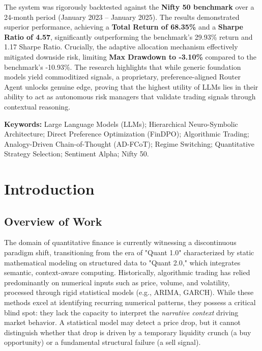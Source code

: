 \documentclass[12pt, a4paper]{report}
\begin{document}
The system was rigorously backtested against the \textbf{Nifty 50 benchmark} over a 24-month period (January 2023 – January 2025). The results demonstrated superior performance, achieving a \textbf{Total Return of 68.35\%} and a \textbf{Sharpe Ratio of 4.57}, significantly outperforming the benchmark’s 29.93\% return and 1.17 Sharpe Ratio. Crucially, the adaptive allocation mechanism effectively mitigated downside risk, limiting \textbf{Max Drawdown to -3.10\%} compared to the benchmark's -10.93\%. The research highlights that while generic foundation models yield commoditized signals, a proprietary, preference-aligned Router Agent unlocks genuine edge, proving that the highest utility of LLMs lies in their ability to act as autonomous risk managers that validate trading signals through contextual reasoning.

\vspace{1em}
\textbf{Keywords:} Large Language Models (LLMs); Hierarchical Neuro-Symbolic Architecture; Direct Preference Optimization (FinDPO); Algorithmic Trading; Analogy-Driven Chain-of-Thought (AD-FCoT); Regime Switching; Quantitative Strategy Selection; Sentiment Alpha; Nifty 50.


\newpage
\tableofcontents
\newpage
\listoffigures
\listoftables



\newpage
{}


\newpage
\chapter{Introduction}

\section{Overview of Work}

The domain of quantitative finance is currently witnessing a discontinuous paradigm shift, transitioning from the era of "Quant 1.0" characterized by static mathematical modeling on structured data to "Quant 2.0," which integrates semantic, context-aware computing. Historically, algorithmic trading has relied predominantly on numerical inputs such as price, volume, and volatility, processed through rigid statistical models (e.g., ARIMA, GARCH). While these methods excel at identifying recurring numerical patterns, they possess a critical blind spot: they lack the capacity to interpret the \textit{narrative context} driving market behavior. A statistical model may detect a price drop, but it cannot distinguish whether that drop is driven by a temporary liquidity crunch (a buy opportunity) or a fundamental structural failure (a sell signal).
\end{document}
